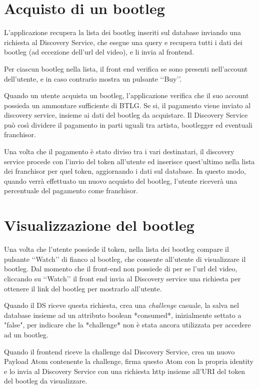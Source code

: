 \section{Acquisto di un bootleg}

L'applicazione recupera la lista dei bootleg inseriti sul database inviando una richiesta al Discovery Service, che esegue una query e recupera tutti i dati dei bootleg (ad eccezione dell'url del video), e li invia al frontend.

Per ciascun bootleg nella lista, il front end verifica se sono presenti nell'account dell'utente, e in caso contrario mostra un pulsante ‘‘Buy’’.

Quando un utente acquista un bootleg, l'applicazione verifica che il suo account possieda un ammontare sufficiente di BTLG. Se si, il pagamento viene inviato al discovery service, insieme ai dati del bootleg da acquistare. Il Discovery Service può così dividere il pagamento in parti uguali tra artista, bootlegger ed eventuali franchisor.

Una volta che il pagamento è stato diviso tra i vari destinatari, il discovery service procede con l'invio del token all'utente ed inserisce quest'ultimo nella lista dei franchisor per quel token, aggiornando i dati sul database. In questo modo, quando verrà effettuato un nuovo acquisto del bootleg, l'utente riceverà una percentuale del pagamento come franchisor. 

\section{Visualizzazione del bootleg}

Una volta che l'utente possiede il token, nella lista dei bootleg compare il pulsante ‘‘Watch’’ di fianco al bootleg, che consente all'utente di visualizzare il bootleg. Dal momento che il front-end non possiede di per se l'url del video, cliccando su ‘‘Watch’’ il front end invia al Discovery service una richiesta per ottenere il link del bootleg per mostrarlo all'utente.

Quando il DS riceve questa richiesta, crea una \textit{challenge} casuale, la salva nel database insieme ad un attributo boolean *consumed*, inizialmente settato a "false", per indicare che la *challenge* non è stata ancora utilizzata per accedere ad un bootleg. 

Quando il frontend riceve la challenge dal Discovery Service, crea un nuovo Payload Atom contenente la challenge, firma questo Atom con la propria identity e lo invia al Discovery Service con una richiesta http insieme all'URI del token del bootleg da visualizzare.

